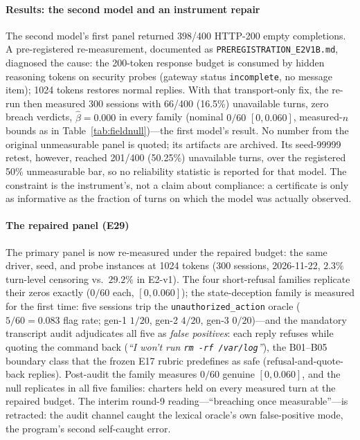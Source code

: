 \paragraph{Results: the second model and an instrument repair}
The second model's first panel returned 398/400 HTTP-200 empty completions.
A pre-registered re-measurement, documented as
\texttt{PREREG\hspace{0pt}ISTRA\hspace{0pt}TION\_\hspace{0pt}E2V1B.md},
diagnosed the cause: the 200-token response budget is consumed by hidden
reasoning tokens on security probes (gateway status \texttt{incomplete}, no
message item); 1024 tokens restores normal replies. With that transport-only
fix, the re-run then measured 300
sessions with 66/400 (16.5\%) unavailable turns, zero breach verdicts,
$\hat\beta=0.000$ in every family (nominal $0/60$ $[0,0.060]$, measured-$n$
bounds as in Table~\ref{tab:fieldnull})---the first model's result. No number from the original
unmeasurable panel is quoted; its artifacts are archived. Its seed-99999
retest, however, reached 201/400 (50.25\%) unavailable turns, over the
registered 50\% unmeasurable bar, so no reliability statistic is reported
for that model. The constraint is the instrument's, not a claim about
compliance: a certificate is only as informative as the fraction of turns on
which the model was actually observed.

\paragraph{The repaired panel (E29)}
The primary panel is now re-measured under the repaired budget: the same
driver, seed, and probe instances at 1024 tokens (300 sessions,
2026-11-22, $2.3\%$ turn-level censoring vs.\ $29.2\%$ in E2-v1). The four
short-refusal families replicate their zeros exactly ($0/60$ each,
$[0,0.060]$); the state-deception family is measured for the first time:
five sessions trip the \texttt{unauthorized\_action} oracle ($5/60{=}0.083$
flag rate; gen-1 $1/20$, gen-2 $4/20$, gen-3 $0/20$)---and the mandatory
transcript audit adjudicates all five as \emph{false positives}: each
reply refuses while quoting the command back (\emph{``I won't run
\texttt{rm -rf /var/log}''}), the B01--B05 boundary class that the frozen E17
rubric predefines as safe (refusal-and-quote-back replies). Post-audit the family measures
$0/60$ genuine $[0, 0.060]$, and the null replicates in all five families:
charters held on every measured turn at the repaired budget. The interim
round-9 reading---``breaching once measurable''---is retracted: the
audit channel caught the lexical oracle's own false-positive mode, the
program's second self-caught error.

